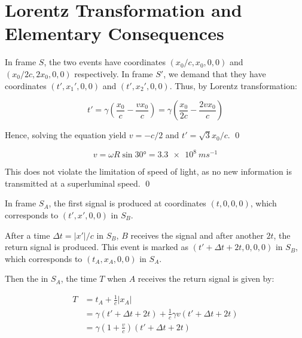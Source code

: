 \documentclass[12pt]{article}
\begin{document}



\pagebreak
\section*{Lorentz Transformation and Elementary Consequences}



In frame $S$, the two events have coordinates $(x_{0}/c, x_{0}, 0, 0)$ and $(x_{0}/2c, 2x_{0}, 0, 0)$ respectively. In frame $S'$, we demand that they have coordinates $(t', x_{1}', 0, 0)$ and $(t', x_{2}', 0, 0)$. Thus, by Lorentz transformation:

\begin{equation}
    t' = \gamma (\frac{x_{0}}{c} - \frac{v x_{0}}{c}) = \gamma (\frac{x_{0}}{2c} - \frac{2v x_{0}}{c})
\end{equation}

Hence, solving the equation yield $v = -c/2$ and $t' = \sqrt{3}x_{0}/c$.
\qed



\begin{equation}
    v = \omega R \sin{\ang{30}} = \qty{3.3e8}{m s^{-1}}
\end{equation}

This does not violate the limitation of speed of light, as no new information is transmitted at a superluminal speed.
\qed



In frame $S_{A}$, the first signal is produced at coordinates $(t, 0, 0, 0)$, which corresponds to $(t', x', 0, 0)$ in $S_{B}$.

After a time $\Delta t = \left\lvert x' \right\rvert/c$ in $S_{B}$, $B$ receives the signal and after another $2t$, the return signal is produced. This event is marked as $(t' + \Delta t + 2t, 0, 0, 0)$ in $S_{B}$, which corresponds to $(t_{A}, x_{A}, 0, 0)$ in $S_{A}$.

Then the in $S_{A}$, the time $T$ when $A$ receives the return signal is given by:

\begin{equation}
    \begin{split}
        T &= t_{A} + \frac{1}{c} \left\lvert x_{A} \right\rvert \\
        &= \gamma (t' + \Delta t + 2t) + \frac{1}{c} \gamma v (t' + \Delta t + 2t) \\
        &= \gamma (1 + \frac{v}{c}) (t' + \Delta t + 2t)
    \end{split}
\end{equation}
\end{document}
